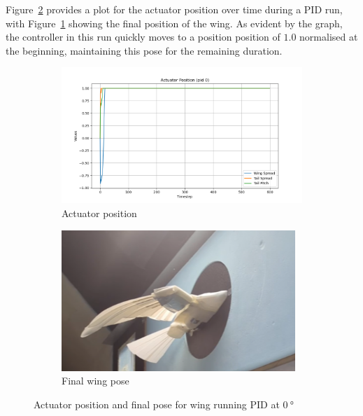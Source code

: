 Figure~\ref{fig:measurement_actuator-PID0} provides a plot for the actuator position over time during a PID run, with Figure~\ref{fig:measurement_actuator-PID0b} showing the final position of the wing. As evident by the graph, the controller in this run quickly moves to a position position of $1.0$ normalised at the beginning, maintaining this pose for the remaining duration. 

\begin{figure}[h]
    \begin{subfigure}[b]{0.53\textwidth}
        \centering
        \includegraphics[width=\textwidth]{./img/ActuatorPID0.png}
        \caption{Actuator position}
    \end{subfigure}
    \begin{subfigure}[b]{0.45\textwidth}
        \centering
        \includegraphics[width=\textwidth]{./img/wing_PID0.png}
        \caption{Final wing pose}\label{fig:measurement_actuator-PID0b}
    \end{subfigure}
    \caption{Actuator position and final pose for wing running PID at $\SI{0}{\degree}$}
    \label{fig:measurement_actuator-PID0}
\end{figure}\vspace{1em}

